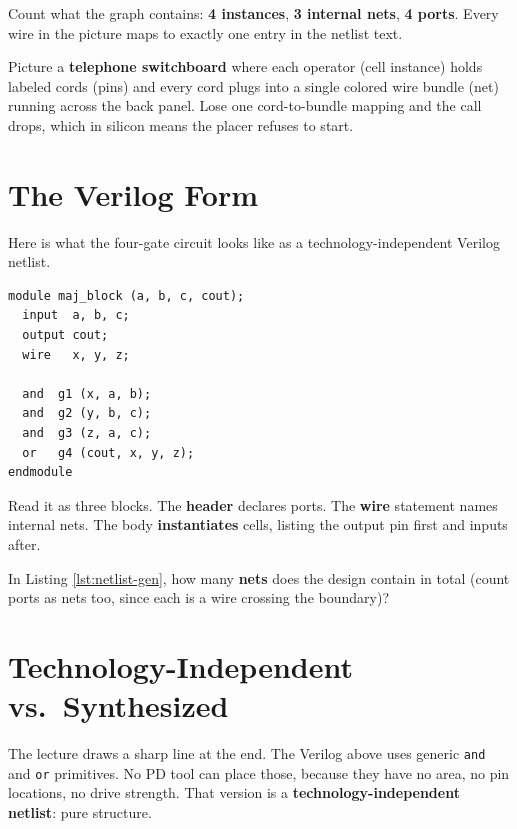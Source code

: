 Count what the graph contains: \textbf{4 instances}, \textbf{3 internal nets}, \textbf{4 ports}. Every wire in the picture maps to exactly one entry in the netlist text.

\begin{hook}
Picture a \textbf{telephone switchboard} where each operator (cell instance) holds labeled cords (pins) and every cord plugs into a single colored wire bundle (net) running across the back panel. Lose one cord-to-bundle mapping and the call drops, which in silicon means the placer refuses to start.
\end{hook}

\section{The Verilog Form}

Here is what the four-gate circuit looks like as a technology-independent Verilog netlist.

\begin{lstlisting}[style=eda,caption={Technology-independent gate-level netlist for the 4-gate example.},label={lst:netlist-gen}]
module maj_block (a, b, c, cout);
  input  a, b, c;
  output cout;
  wire   x, y, z;

  and  g1 (x, a, b);
  and  g2 (y, b, c);
  and  g3 (z, a, c);
  or   g4 (cout, x, y, z);
endmodule
\end{lstlisting}

Read it as three blocks. The \textbf{header} declares ports. The \textbf{wire} statement names internal nets. The body \textbf{instantiates} cells, listing the output pin first and inputs after.

\begin{gut}
In Listing \ref{lst:netlist-gen}, how many \textbf{nets} does the design contain in total (count ports as nets too, since each is a wire crossing the boundary)?
\end{gut}

\section{Technology-Independent vs.\ Synthesized}

The lecture draws a sharp line at the end. The Verilog above uses generic \texttt{and} and \texttt{or} primitives. No PD tool can place those, because they have no area, no pin locations, no drive strength. That version is a \textbf{technology-independent netlist}: pure structure.

